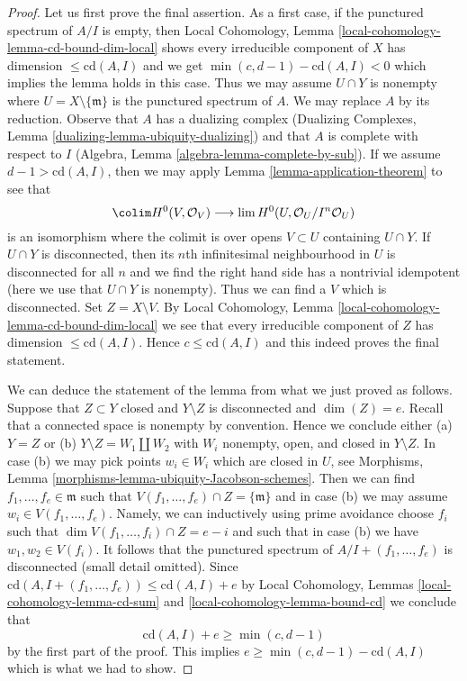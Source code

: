 \begin{proof}
Let us first prove the final assertion. As a first case, if the punctured
spectrum of $A/I$ is empty, then
Local Cohomology, Lemma \ref{local-cohomology-lemma-cd-bound-dim-local}
shows every irreducible component of $X$ has dimension
$\leq \text{cd}(A, I)$ and we get $\min(c, d - 1) - \text{cd}(A, I) < 0$
which implies the lemma holds in this case. Thus we may assume
$U \cap Y$ is nonempty where $U = X \setminus \{\mathfrak m\}$
is the punctured spectrum of $A$. We may replace $A$ by its reduction.
Observe that $A$ has a dualizing complex
(Dualizing Complexes, Lemma \ref{dualizing-lemma-ubiquity-dualizing})
and that $A$ is complete with respect to $I$
(Algebra, Lemma \ref{algebra-lemma-complete-by-sub}).
If we assume $d - 1 > \text{cd}(A, I)$, then we may apply
Lemma \ref{lemma-application-theorem} to see that
$$
\colim H^0(V, \mathcal{O}_V)
\longrightarrow
\lim H^0(U, \mathcal{O}_U/I^n\mathcal{O}_U)
$$
is an isomorphism where the colimit is over opens $V \subset U$
containing $U \cap Y$. If $U \cap Y$ is disconnected, then
its $n$th infinitesimal neighbourhood in $U$ is disconnected
for all $n$ and we find the
right hand side has a nontrivial idempotent (here we use
that $U \cap Y$ is nonempty).
Thus we can find a $V$ which is disconnected.
Set $Z = X \setminus V$. By
Local Cohomology, Lemma \ref{local-cohomology-lemma-cd-bound-dim-local}
we see that every irreducible component of $Z$ has dimension
$\leq \text{cd}(A, I)$. Hence $c \leq \text{cd}(A, I)$ and this
indeed proves the final statement.

\medskip\noindent
We can deduce the statement of the lemma from what we just proved
as follows. Suppose that $Z \subset Y$ closed and $Y \setminus Z$ is
disconnected and $\dim(Z) = e$. Recall that a connected space is nonempty
by convention. Hence we conclude either (a) $Y = Z$ or (b)
$Y \setminus Z = W_1 \amalg W_2$ with $W_i$ nonempty, open, and closed
in $Y \setminus Z$. In case (b) we may pick points $w_i \in W_i$
which are closed in $U$, see
Morphisms, Lemma \ref{morphisms-lemma-ubiquity-Jacobson-schemes}.
Then we can find $f_1, \ldots, f_e \in \mathfrak m$
such that $V(f_1, \ldots, f_e) \cap Z = \{\mathfrak m\}$
and in case (b) we may assume $w_i \in V(f_1, \ldots, f_e)$.
Namely, we can inductively using prime avoidance
choose $f_i$ such that $\dim V(f_1, \ldots, f_i) \cap Z = e - i$
and such that in case (b) we have $w_1, w_2 \in V(f_i)$.
It follows that the punctured spectrum of $A/I + (f_1, \ldots, f_e)$
is disconnected (small detail omitted). Since
$\text{cd}(A, I + (f_1, \ldots, f_e)) \leq \text{cd}(A, I) + e$ by
Local Cohomology, Lemmas \ref{local-cohomology-lemma-cd-sum} and
\ref{local-cohomology-lemma-bound-cd} we conclude that
$$
\text{cd}(A, I) + e \geq \min(c, d - 1)
$$
by the first part of the proof. This implies
$e \geq \min(c, d - 1) - \text{cd}(A, I)$ which is what we had to show.
\end{proof}

